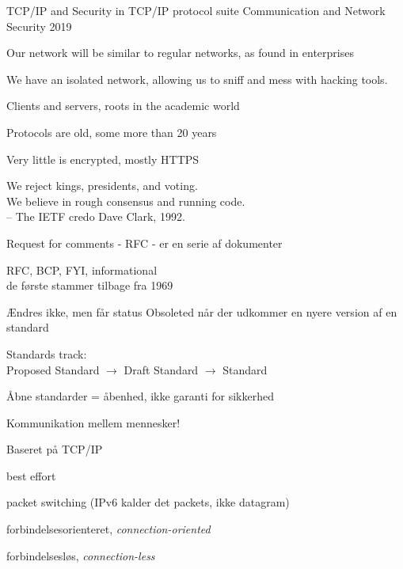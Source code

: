 \documentclass[Screen16to9,17pt]{foils}
\begin{document}
\mytitlepage
{TCP/IP and Security in TCP/IP protocol suite}
{Communication and Network Security 2019}







\begin{list1}
\item Our network will be similar to regular networks, as found in enterprises
\item We have an isolated network, allowing us to sniff and mess with hacking tools.
\end{list1}





\begin{list1}
\item Clients and servers, roots in the academic world
\item Protocols are old, some more than 20 years
\item Very little is encrypted, mostly HTTPS
\end{list1}


{\hlkbig \color{titlecolor}
We reject kings, presidents, and voting.\\
We believe in rough consensus and running code.\\
-- The IETF credo Dave Clark, 1992.}

\begin{list1}
\item Request for comments - RFC - er en serie af dokumenter
\item RFC, BCP, FYI, informational\\
de første stammer tilbage fra 1969
\item Ændres ikke, men får status Obsoleted når der udkommer en nyere
  version af en standard
\item Standards track:\\
Proposed Standard $\rightarrow$ Draft Standard $\rightarrow$ Standard
\item  Åbne standarder = åbenhed, ikke garanti for sikkerhed
\end{list1}



\begin{list1}
\item Kommunikation mellem mennesker!
\item Baseret på TCP/IP
\begin{list2}
\item best effort
\item packet switching (IPv6 kalder det packets, ikke datagram)
\item forbindelsesorienteret, \emph{connection-oriented}
\item forbindelsesløs, \emph{connection-less}
\end{list2}
\end{list1}
\end{document}
